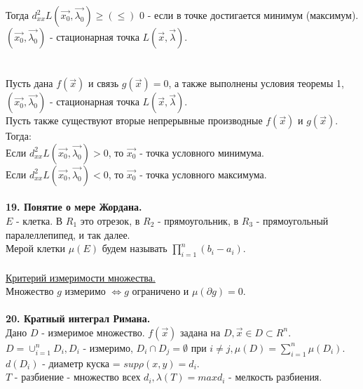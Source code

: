 \documentclass[12pt]{article}
\begin{document}
Тогда $d^2_{xx} L (\overrightarrow{x_0},\overrightarrow{\lambda_0}) \geq (\leq)$ 0 - если в точке достигается минимум (максимум).\\
$(\overrightarrow{x_0},\overrightarrow{\lambda_0})$ - стационарная точка $L(\overrightarrow{x},\overrightarrow{\lambda})$.\\
\\
\\
Пусть дана $f(\overrightarrow{x})$ и связь $g(\overrightarrow{x}) = 0$, а также выполнены условия теоремы 1, $(\overrightarrow{x_0},\overrightarrow{\lambda_0})$ - стационарная точка $L(\overrightarrow{x},\overrightarrow{\lambda})$.\\
Пусть также существуют вторые непрерывные производные $f(\overrightarrow{x})$ и $g(\overrightarrow{x})$.\\
Тогда:\\
Если $d^2_{xx}L(\overrightarrow{x_0},\overrightarrow{\lambda_0}) >0$, то $\overrightarrow{x_0}$ - точка условного минимума.\\
Если $d^2_{xx}L(\overrightarrow{x_0},\overrightarrow{\lambda_0}) <0$, то $\overrightarrow{x_0}$ - точка условного максимума.\\
\\
\label{question19_1}\textbf{19. Понятие о мере Жордана.}\\
$E$ - клетка. В $R_1$ это отрезок, в $R_2$ - прямоугольник, в $R_3$ - прямоугольный паралеллепипед, и так далее.\\
Мерой клетки $\mu (E)$ будем называть $\prod_{i=1}^n (b_i - a_i)$.\\
\\
\label{question19_2}\uline{Критерий измеримости множества.}\\
Множество $g$ измеримо $\iff g$ ограничено и $\mu(\partial g) = 0$.\\
\\
\label{question20_1}\textbf{20. Кратный интеграл Римана.}\\
Дано $D$ - измеримое множество. $f(\overrightarrow{x})$ задана на $D, \overrightarrow{x} \in D \subset R^n$.\\
$D = \cup_{i=1}^n D_i, D_i$ - измеримо, $D_i \cap D_j = \emptyset$ при $i \neq j, \mu (D) = \sum_{i=1}^n \mu(D_i)$.\\
$d(D_i)$ - диаметр куска = $sup \rho(x,y) = d_i$.\\
$T$ - разбиение - множество всех $d_i, \lambda(T) = max d_i$ - мелкость разбиения.\\
\end{document}
